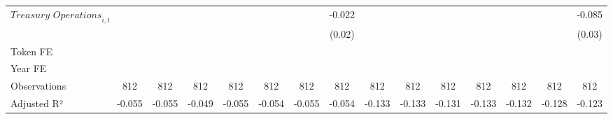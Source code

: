 {\begin{tabular}{l*{14}{c}}
$\textit{Treasury Operations}_{i,t}$&                     &                     &                     &                     &                     &                     &      -0.022         &                     &                     &                     &                     &                     &                     &      -0.085\sym{***}\\
                    &                     &                     &                     &                     &                     &                     &      (0.02)         &                     &                     &                     &                     &                     &                     &      (0.03)         \\
\midrule
Token FE            &                     &                     &                     &                     &                     &                     &                     &                     &                     &                     &                     &                     &                     &                     \\
Year FE             &                     &                     &                     &                     &                     &                     &                     &                     &                     &                     &                     &                     &                     &                     \\
Observations        &         812         &         812         &         812         &         812         &         812         &         812         &         812         &         812         &         812         &         812         &         812         &         812         &         812         &         812         \\
Adjusted R²         &      -0.055         &      -0.055         &      -0.049         &      -0.055         &      -0.054         &      -0.055         &      -0.054         &      -0.133         &      -0.133         &      -0.131         &      -0.133         &      -0.132         &      -0.128         &      -0.123         \\
\bottomrule
\end{tabular}
}
